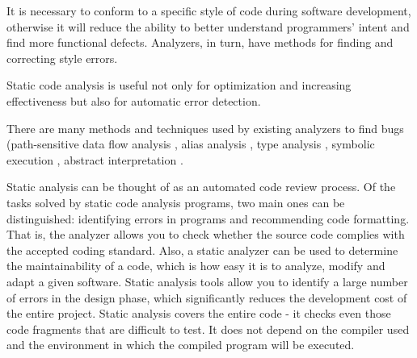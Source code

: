 It is necessary to conform to a specific style of code during software development, otherwise it will reduce the ability to better understand programmers’ intent and ﬁnd more functional defects. Analyzers, in turn, have methods for finding and correcting style errors. 

Static code analysis is useful not only for optimization and increasing effectiveness but also for automatic error detection.

There are many methods and techniques used by existing analyzers to ﬁnd bugs (path-sensitive data ﬂow analysis \cite{ref:kremenek}, alias analysis \cite{ref:effective}, type analysis \cite{ref:simple}, symbolic execution \cite{ref:dis}, abstract interpretation \cite{ref:dis}.

Static analysis can be thought of as an automated code review process. Of the tasks solved by static code analysis programs, two main ones can be distinguished: identifying errors in programs and recommending code formatting. That is, the analyzer allows you to check whether the source code complies with the accepted coding standard. Also, a static analyzer can be used to determine the maintainability of a code, which is how easy it is to analyze, modify and adapt a given software. Static analysis tools allow you to identify a large number of errors in the design phase, which significantly reduces the development cost of the entire project. Static analysis covers the entire code - it checks even those code fragments that are difficult to test. It does not depend on the compiler used and the environment in which the compiled program will be executed.